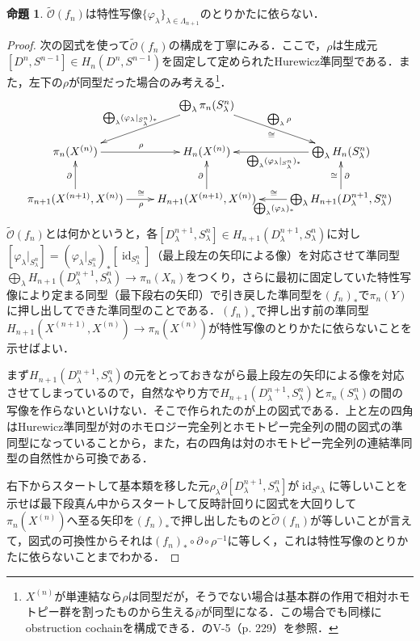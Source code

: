 \documentclass[a4paper,11pt]{jsarticle}
\theoremstyle{definition}
\newtheorem{prop}[thm]{命題}
\DeclareMathOperator{\id}{\mathrm{id}}
\begin{document}
\begin{prop}
  $\tilde{\mathcal{O}}(f_n)$は特性写像$\{\varphi_\lambda\}_{\lambda\in\Lambda_{n+1}}$のとりかたに依らない．
\end{prop}
\begin{proof}
  次の図式を使って$\tilde{\mathcal{O}}(f_n)$の構成を丁寧にみる．ここで，$\rho$は生成元$[D^n,S^{n-1}]\in H_n(D^n,S^{n-1})$を固定して定められたHurewicz準同型である．また，左下の$\rho$が同型だった場合のみ考える\footnote{$X^{(n)}$が単連結なら$\rho$は同型だが，そうでない場合は基本群の作用で相対ホモトピー群を割ったものから生える$\bar{\rho}$が同型になる．この場合でも同様にobstruction cochainを構成できる．\cite{whitehead2012elements}のV-5（p. 229）を参照．}．\[
  \xymatrix{
    &\bigoplus_\lambda\pi_n(S^n_\lambda)\ar[ld]_{\bigoplus_\lambda(\varphi_\lambda|_{S^n_\lambda})_*}\ar[rd]^{\bigoplus_\lambda\rho}_{\cong}&\\
    \pi_n(X^{(n)})\ar[r]^\rho & 
    H_n(X^{(n)})  & 
    \bigoplus_\lambda H_n(S^n_\lambda)\ar[l]^{\bigoplus_\lambda(\varphi_\lambda|_{S^n_\lambda})_*}\\
    \pi_{n+1}(X^{(n+1)},X^{(n)})\ar[u]^{\partial}\ar[r]_\rho^{\cong} & 
    H_{n+1}(X^{(n+1)},X^{(n)})\ar[u]^\partial & 
    \bigoplus_\lambda H_{n+1}(D^{n+1}_\lambda,S^n_\lambda)\ar[u]_\partial^\cong\ar[l]^{\bigoplus_\lambda (\varphi_\lambda)_*}_\cong
  }\]
  $\tilde{\mathcal{O}}(f_n)$とは何かというと，各$[D^{n+1}_\lambda,S^{n}_\lambda]\in H_{n+1}(D^{n+1}_\lambda,S^{n}_\lambda)$に対し$[\varphi_\lambda|_{S^n_\lambda}]=(\varphi_\lambda|_{S^n_\lambda})_*[\id_{S^n_\lambda}]$（最上段左の矢印による像）を対応させて準同型$\bigoplus_\lambda H_{n+1}(D^{n+1}_\lambda,S^n_\lambda)\to \pi_n(X_n)$をつくり，さらに最初に固定していた特性写像により定まる同型（最下段右の矢印）で引き戻した準同型を$(f_n)_*$で$\pi_n(Y)$に押し出してできた準同型のことである．$(f_n)_*$で押し出す前の準同型$H_{n+1}(X^{(n+1)},X^{(n)})\to \pi_n(X^{(n)})$が特性写像のとりかたに依らないことを示せばよい．

  まず$H_{n+1}(D^{n+1}_\lambda,S^n_\lambda)$の元をとっておきながら最上段左の矢印による像を対応させてしまっているので，自然なやり方で$H_{n+1}(D^{n+1}_\lambda,S^n_\lambda)$と$\pi_n(S^n_\lambda)$の間の写像を作らないといけない．そこで作られたのが上の図式である．上と左の四角はHurewicz準同型が対のホモロジー完全列とホモトピー完全列の間の図式の準同型になっていることから，また，右の四角は対のホモトピー完全列の連結準同型の自然性から可換である．

  右下からスタートして基本類を移した元$\rho_\lambda\partial[D^{n+1}_\lambda,S^n_\lambda]$が$\id_{S^n\lambda}$に等しいことを示せば最下段真ん中からスタートして反時計回りに図式を大回りして$\pi_n(X^{(n)})$へ至る矢印を$(f_n)_*$で押し出したものと$\tilde{\mathcal{O}}(f_n)$が等しいことが言えて，図式の可換性からそれは$(f_n)_*\circ\partial\circ\rho^{-1}$に等しく，これは特性写像のとりかたに依らないことまでわかる．
\end{proof}
\end{document}
